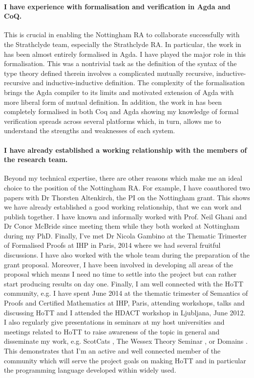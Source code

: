 \documentclass[a4paper]{article}
\begin{document}
\paragraph{I have experience with formalisation and verification in Agda and
  CoQ.} This is crucial in enabling the Nottingham RA to collaborate
successfully with the Strathclyde team, especially the Strathclyde
RA. In particular, the work in
 has been almost
entirely formalised in Agda. I have played the major role in this
formalisation. This was a nontrivial task as the definition of the syntax of
the type theory defined therein involves a complicated mutually
recursive, inductive-recursive and inductive-inductive definition. The
complexity of the formalisation brings the Agda compiler to its limits
and motivated extension of Agda with more liberal form of mutual
definition. In addition, the work in  has been completely
formalised in both Coq and Agda showing my knowledge of formal
verification spreads across several platforms which, in turn, allows
me to understand the strengths and weaknesses of each system.
  

\paragraph{I have already established a working relationship with the
  members of the research team.} Beyond my technical expertise, there
are other reasons which make me an ideal choice to the position of the
Nottingham RA. For example, I have coauthored two papers with Dr
Thorsten Altenkirch, the PI on the Nottingham grant. This shows we have
already established a good working relationship, that we can work and
publish together. I have known and informally worked with Prof. Neil
Ghani and Dr Conor McBride since meeting them while they both worked
at Nottingham during my PhD. Finally, I've met Dr Nicola Gambino at the
Thematic Trimester of Formalised Proofs at IHP in Paris, 2014 where we
had several fruitful discussions. I have also worked with the whole team during
the preparation of the grant proposal. Moreover, I have  been involved
in developing all areas of the proposal which means I need no time to
settle into the project but can rather start producing results on day one.
Finally, I am well connected with the HoTT community, e.g.
I have spent June 2014 at the thematic trimester of Semantics of
Proofs and Certified Mathematics at IHP, Paris, attending workshops,
talks and discussing HoTT and I attended the HDACT workshop in Ljubljana, June 2012. 
I also regularly give presentations in seminars at my host universities and
meetings related to HoTT to raise awareness of the topic in general
and disseminate my work, e.g. ScotCats , The
Wessex Theory Seminar , or Domains .
This demonstrates that I'm an active and well connected member of
the community which will serve the project goals on making HoTT and in
particular the programming language developed within widely used.
\end{document}
